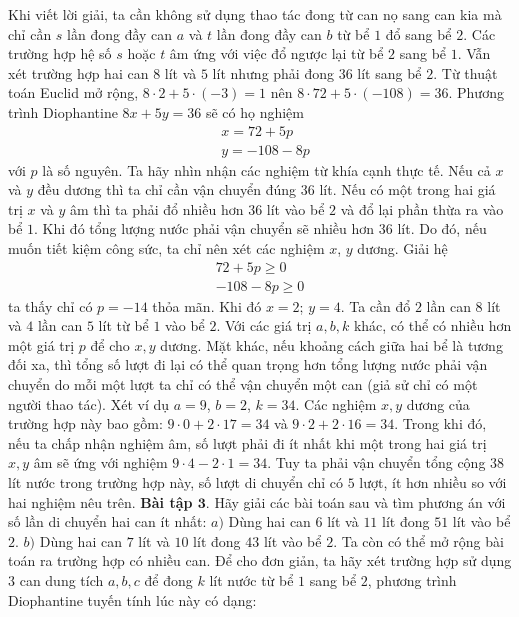 \begin{multicols}{2}
	\vskip 0.1cm
	Khi viết lời giải, ta cần không sử dụng thao tác đong từ can nọ sang can kia mà chỉ cần $s$ lần đong đầy can $a$ và $t$ lần đong đầy can $b$ từ bể $1$ đổ sang bể $2$. Các trường hợp hệ số $s$ hoặc $t$ âm ứng với việc đổ ngược lại từ bể $2$ sang bể $1$.
	\vskip 0.1cm
	Vẫn xét trường hợp hai can $8$ lít và $5$ lít nhưng phải đong $36$ lít sang bể $2$. Từ thuật toán Euclid mở rộng, $8\cdot 2+5\cdot (-3)=1$ nên $8\cdot 72+5\cdot (-108)=36$. Phương trình Diophantine $8x+5y=36$ sẽ có họ nghiệm 
	\begin{align*}
		&x=72+5p\\
		&y=-108-8p
	\end{align*}
	với $p$ là số nguyên.
	\vskip 0.1cm
	Ta hãy nhìn nhận các nghiệm từ khía cạnh thực tế. Nếu cả $x$ và $y$ đều dương thì ta chỉ cần vận chuyển đúng $36$ lít. Nếu có một trong hai giá trị $x$ và $y$ âm thì ta phải đổ nhiều hơn $36$ lít vào bể $2$ và đổ lại phần thừa ra vào bể $1$. Khi đó tổng lượng nước phải vận chuyển sẽ nhiều hơn $36$ lít. Do đó, nếu muốn tiết kiệm công sức, ta chỉ nên xét các nghiệm $x$, $y$ dương. 
	\vskip 0.1cm
	Giải hệ
	\begin{align*}
		72+5p \ge 0\\
		-108-8p\ge 0
	\end{align*}
	ta thấy chỉ có $p=-14$ thỏa mãn. Khi đó $x=2$; $y=4$. Ta cần đổ $2$ lần can $8$ lít và $4$ lần can $5$ lít từ bể $1$ vào bể $2$. Với các giá trị $a,b,k$ khác, có thể có nhiều hơn một giá trị $p$ để cho $x,y$ dương.
	\vskip 0.1cm
	Mặt khác, nếu khoảng cách giữa hai bể là tương đối xa, thì tổng số lượt đi lại có thể quan trọng hơn tổng lượng nước phải vận chuyển do mỗi một lượt ta chỉ có thể vận chuyển một can (giả sử chỉ có một người thao tác). Xét ví dụ $a=9$, $b=2$, $k=34$. Các nghiệm $x,y$ dương của trường hợp này bao gồm: $9\cdot 0+2\cdot 17=34$ và $9\cdot 2+2\cdot 16=34$.
	\vskip 0.1cm
	Trong khi đó, nếu ta chấp nhận nghiệm âm, số lượt phải đi ít nhất khi một trong hai giá trị $x,y$ âm sẽ ứng với nghiệm $9\cdot 4-2\cdot 1=34$. Tuy ta phải vận chuyển tổng cộng $38$ lít nước trong trường hợp này, số lượt di chuyển chỉ có $5$ lượt, ít hơn nhiều so với hai nghiệm nêu trên.
	\vskip 0.1cm
	\textbf{\color{hoccungpi}Bài tập $\pmb{3.}$}
	Hãy giải các bài toán sau và tìm phương án với số lần di chuyển hai can ít nhất:
	\vskip 0.1cm
	$a)$ Dùng hai can $6$ lít và $11$ lít đong $51$ lít vào bể $2$.
	\vskip 0.1cm
	$b)$ Dùng hai can $7$ lít và $10$ lít đong $43$ lít vào bể $2$.
	\vskip 0.1cm
	Ta còn có thể mở rộng bài toán ra trường hợp có nhiều can. Để cho đơn giản, ta hãy xét trường hợp sử dụng $3$ can dung tích $a,b,c$ để đong $k$ lít nước từ bể $1$ sang bể $2$, phương trình Diophantine tuyến tính lúc này có dạng:

\end{multicols}
